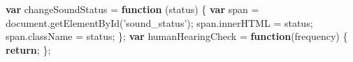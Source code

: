 \documentclass[]{article}
\newenvironment{Shaded}{}{}
\newcommand{\KeywordTok}[1]{\textcolor[rgb]{0.00,0.44,0.13}{\textbf{#1}}}
\newcommand{\StringTok}[1]{\textcolor[rgb]{0.25,0.44,0.63}{#1}}
\newcommand{\VariableTok}[1]{\textcolor[rgb]{0.10,0.09,0.49}{#1}}
\newcommand{\ControlFlowTok}[1]{\textcolor[rgb]{0.00,0.44,0.13}{\textbf{#1}}}
\newcommand{\OperatorTok}[1]{\textcolor[rgb]{0.40,0.40,0.40}{#1}}
\newcommand{\AttributeTok}[1]{\textcolor[rgb]{0.49,0.56,0.16}{#1}}
\newcommand{\NormalTok}[1]{#1}
\begin{document}
\begin{Shaded}
\begin{Highlighting}[]
\KeywordTok{var}\NormalTok{ changeSoundStatus }\OperatorTok{=} \KeywordTok{function}\NormalTok{ (status) }\OperatorTok{\{}
    \KeywordTok{var}\NormalTok{ span }\OperatorTok{=} \VariableTok{document}\NormalTok{.}\AttributeTok{getElementById}\NormalTok{(}\StringTok{'sound_status'}\NormalTok{)}\OperatorTok{;}
    \VariableTok{span}\NormalTok{.}\AttributeTok{innerHTML} \OperatorTok{=}\NormalTok{ status}\OperatorTok{;}
    \VariableTok{span}\NormalTok{.}\AttributeTok{className} \OperatorTok{=}\NormalTok{ status}\OperatorTok{;}
\OperatorTok{\};}
\KeywordTok{var}\NormalTok{ humanHearingCheck }\OperatorTok{=} \KeywordTok{function}\NormalTok{(frequency) }\OperatorTok{\{}
    \ControlFlowTok{return}\OperatorTok{;}
\OperatorTok{\};}
\end{Highlighting}
\end{Shaded}
\end{document}
